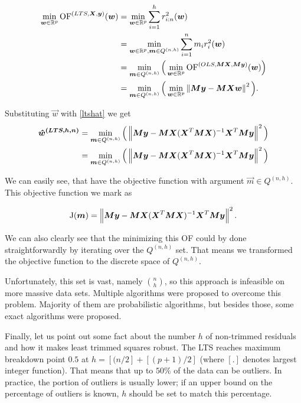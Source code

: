 \begin{align*} 
\operatorname*{min}_{\boldsymbol{w} \in \mathbb{R}^p} 
    \operatorname{OF}^{(LTS,\boldsymbol{X}, \boldsymbol{y})}(\boldsymbol{w})  
&=\operatorname*{min}_{\boldsymbol{w} \in \mathbb{R}^p} 
    \sum\limits_{i=1}^h r_{i:n}^2(\boldsymbol{w})  \\
&= \operatorname*{min}_{\boldsymbol{w} \in \mathbb{R}^p,\boldsymbol{m} \in Q^{(n,h)}} 
        \sum\limits_{i=1}^n m_i r_{i}^2(\boldsymbol{w})\\
&= \operatorname*{min}_{\boldsymbol{m} \in Q^{(n,h)}} 
            \Big( \operatorname*{min}_{\boldsymbol{w} \in\mathbb{R}^p} 
            \operatorname{OF}^{(OLS,\boldsymbol{M}\boldsymbol{X},  \boldsymbol{M}\boldsymbol{y} )} (\boldsymbol{w}) \Big)\\
&= \operatorname*{min}_{\boldsymbol{m} \in Q^{(n,h)}} 
            \Big(\operatorname*{min}_{\boldsymbol{w} \in\mathbb{R}^p}  
            \left\lVert \boldsymbol{M}\boldsymbol{y} -   \boldsymbol{M}\boldsymbol{X}\boldsymbol{w}  \right\rVert^2 \Big).
\end{align*}

Substituting $\vec{w}$ with \eqref{ltshat} we get
\begin{align*}
\boldsymbol{\hat{w}^{(LTS, h, n)}}
&=  \operatorname*{min}_{\boldsymbol{m} \in Q^{(n,h)}} 
    \Big( \left\lVert \boldsymbol{M}\boldsymbol{y} -  \boldsymbol{M}\boldsymbol{X}(\boldsymbol{X}^T\boldsymbol{M}\boldsymbol{X})^{-1}\boldsymbol{X}^T\boldsymbol{M}\boldsymbol{y}  \right\rVert^2 \Big)\\
&= \operatorname*{min}_{\boldsymbol{m} \in Q^{(n,h)}} 
    \Big( \left\lVert \boldsymbol{M}\boldsymbol{y} -  \boldsymbol{M}\boldsymbol{X}(\boldsymbol{X}^T\boldsymbol{M}\boldsymbol{X})^{-1}\boldsymbol{X}^T\boldsymbol{M}\boldsymbol{y}  \right\rVert^2 \Big)
\end{align*}

We can easily see, that have the objective function with argument $\vec{m} \in Q^{(n,h)}$. This objective function we mark as

\begin{equation} \label{oflts_discrete}
    \operatorname{J}(\boldsymbol{m}) =  \left\lVert \boldsymbol{M}\boldsymbol{y} -  \boldsymbol{M}\boldsymbol{X}(\boldsymbol{X}^T\boldsymbol{M}\boldsymbol{X})^{-1}\boldsymbol{X}^T\boldsymbol{M}\boldsymbol{y}  \right\rVert^2.
\end{equation}

We can also clearly see that the minimizing this OF could by done straightforwardly by iterating over the $Q^{(n,h)}$ set. That means we transformed the objective function to the discrete space of $Q^{(n,h)}$.

Unfortunately, this set is vast, namely $\binom{n}{h}$, so this approach is infeasible on more massive data sets. Multiple algorithms were proposed to overcome this problem. Majority of them are probabilistic algorithms, but besides those, some exact algorithms were proposed. 

Finally, let us point out some fact about the number $h$ of non-trimmed residuals and how it makes least trimmed squares robust.
The LTS reaches maximum breakdown point $0.5$ at $h = [(n/2] + [(p+1)/2]$ \cite{agullo2001new}(where $[.]$ denotes largest integer function).
That means that up to $50\%$ of the data can be outliers. In practice, the portion of outliers is usually lower; if an upper bound on the percentage of outliers is known,  $h$ should be set to match this percentage.